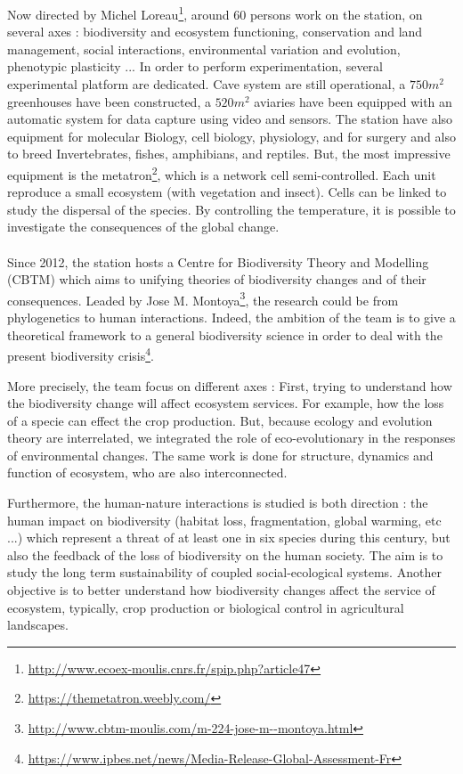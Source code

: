 \documentclass{article}
\begin{document}
Now directed by Michel Loreau\footnote{\url{http://www.ecoex-moulis.cnrs.fr/spip.php?article47}}, around 60 persons work on the station, on several axes : biodiversity and ecosystem functioning, conservation and land management, social interactions, environmental variation and evolution, phenotypic plasticity ...
In order to perform experimentation, several experimental platform are dedicated. Cave system are still operational, a $750m^2$ greenhouses have been constructed, a $520m^2$ aviaries have been equipped with an automatic system for data capture using video and sensors. The station have also equipment for molecular Biology, cell biology, physiology, and for surgery and also to breed Invertebrates, fishes, amphibians, and reptiles. But, the most impressive equipment is the metatron\footnote{\url{https://themetatron.weebly.com/}}, which is a network cell semi-controlled. Each unit reproduce a small ecosystem (with vegetation and insect). Cells can be linked to study the dispersal of the species. By controlling the temperature, it is possible to investigate the consequences of the global change.



\paragraph{}
Since 2012, the station hosts a Centre for Biodiversity Theory and Modelling (CBTM)  which aims to unifying theories of biodiversity changes and of their consequences. Leaded by 
Jose M. Montoya\footnote{\url{http://www.cbtm-moulis.com/m-224-jose-m--montoya.html}}, the research could be from phylogenetics to human interactions. Indeed, the ambition of the team is to give a theoretical framework to a general biodiversity science in order to deal with the present biodiversity crisis\footnote{\url{https://www.ipbes.net/news/Media-Release-Global-Assessment-Fr}}.

More precisely, the team focus on different axes : First,  trying to understand how the biodiversity change will affect ecosystem services. For example, how the loss of a specie can effect the crop production. But, because ecology and evolution theory are interrelated, we integrated the role of eco-evolutionary in the responses of environmental changes. The same work is done for structure, dynamics and function of ecosystem, who are also interconnected. \cite{bastazini2019loss}\cite{bideault2019temperature}\cite{galiana2019geographical}


Furthermore, the human-nature interactions is studied is both direction : the human impact on biodiversity (habitat loss, fragmentation, global warming, etc ...) which represent a threat of at least one in six species during this century, but also the feedback of the loss of biodiversity on the human society. The aim is to study the long term sustainability of coupled social-ecological systems. Another objective is to better understand how biodiversity changes affect the service of ecosystem, typically, crop production or biological control in agricultural landscapes.
\cite{cazalis2018we}\cite{lafuite2018sustainable}\cite{montoya2018trade}\cite{montoya2019trade}
\end{document}
